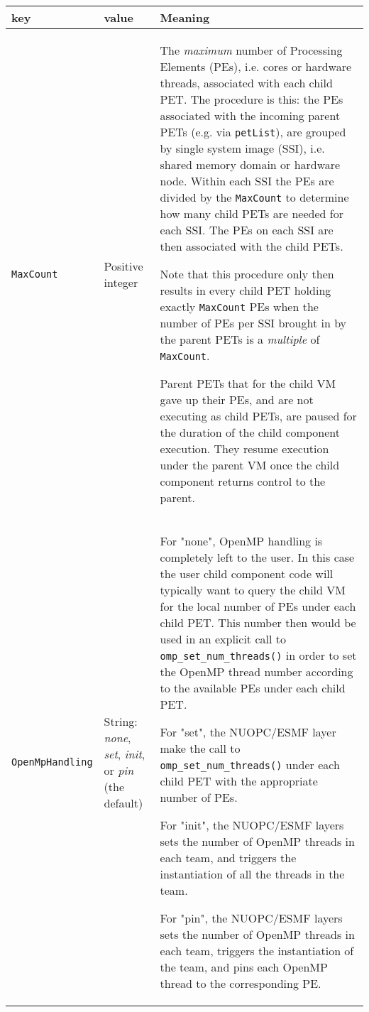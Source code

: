 \vspace*{2ex}
\begin{longtable}[h]{|p{}|p{}|p{}|}
     \hline\hline
     {\bf key} & {\bf value} & {\bf Meaning}\\
     \hline\hline
     
     {\tt MaxCount}         & Positive integer    &
        The {\em maximum} number of Processing Elements (PEs), i.e. cores or hardware threads, associated with each child PET. The procedure is this: the PEs associated with the incoming parent PETs (e.g. via {\tt petList}), are grouped by single system image (SSI), i.e. shared memory domain or hardware node. Within each SSI the PEs are divided by the {\tt MaxCount} to determine how many child PETs are needed for each SSI. The PEs on each SSI are then associated with the child PETs.
        
        Note that this procedure only then results in every child PET holding exactly {\tt MaxCount} PEs when the number of PEs per SSI brought in by the parent PETs is a {\em multiple} of {\tt MaxCount}.
         
        Parent PETs that for the child VM gave up their PEs, and are not executing as child PETs, are paused for the duration of the child component execution. They resume execution under the parent VM once the child component returns control to the parent. \\ \hline
        
     {\tt OpenMpHandling}   & String: {\em none}, {\em set}, {\em init}, or {\em pin} (the default) &
        For "none", OpenMP handling is completely left to the user. In this case the user child component code will typically want to query the child VM for the local number of PEs under each child PET. This number then would be used in an explicit call to {\tt omp\_set\_num\_threads()} in order to set the OpenMP thread number according to the available PEs under each child PET.
        
        For "set", the NUOPC/ESMF layer make the call to {\tt omp\_set\_num\_threads()} under each child PET with the appropriate number of PEs.
        
        For "init", the NUOPC/ESMF layers sets the number of OpenMP threads in each team, and triggers the instantiation of all the threads in the team.

        For "pin", the NUOPC/ESMF layers sets the number of OpenMP threads in each team, triggers the instantiation of the team, and pins each OpenMP thread to the corresponding PE.
        \\ \hline


\end{longtable}
